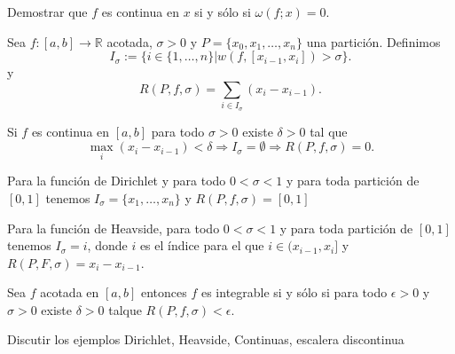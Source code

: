 \begin{ejercicio}{}
 Demostrar que $f$ es continua en $x$ si y sólo si $\omega(f;x)=0$.
\end{ejercicio}




\begin{definicion}{} Sea $f:[a,b]\to\mathbb{R}$ acotada, $\sigma>0$ y $P=\{x_0,x_1,\ldots,x_n\}$ una partición. Definimos
\[
 I_{\sigma}:=\{i\in\{1,\ldots,n\}|w(f,[x_{i-1},x_i])>\sigma\}.
\]
y
\[
 R(P,f,\sigma)=\sum_{i\in I_{\sigma}}(x_i-x_{i-1}).
\]
\end{definicion}





\begin{proposicion}{} Si $f$ es continua en $[a,b]$ para todo $\sigma>0$ existe $\delta>0$ tal que 
\[
\max_i(x_i-x_{i-1})<\delta\Rightarrow I_{\sigma}=\emptyset\Rightarrow R(P,f,\sigma)=0. 
\]

 
\end{proposicion}

\begin{ejemplo}{} Para la función de Dirichlet y para todo $0<\sigma<1$ y para toda partición de $[0,1]$ tenemos $I_{\sigma}=\{x_1,\ldots,x_n\}$ y $R(P,f,\sigma)=[0,1]$
 
\end{ejemplo}

\begin{ejemplo}{} Para la función de Heavside,   para todo $0<\sigma<1$ y para toda partición de $[0,1]$ tenemos $I_{\sigma}=i$, donde $i$ es el índice para el que $i\in (x_{i-1},x_i]$ y $R(P,F,\sigma)=x_i-x_{i-1}$.
 
\end{ejemplo}

\begin{teorema}{} Sea $f$ acotada en $[a,b]$ entonces $f$ es integrable si y sólo si  para todo $\epsilon>0$ y $\sigma>0$ existe $\delta>0$ talque $R(P,f,\sigma)<\epsilon$.
\end{teorema}

\begin{ejemplo}{} Discutir los ejemplos Dirichlet, Heavside, Continuas, escalera discontinua
 
\end{ejemplo}

